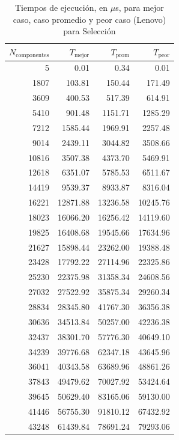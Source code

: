 \documentclass{homework}
\begin{document}
    \begin{table}[H] 
        \footnotesize
        \centering 
        \begin{tabular}{|r|r|r|r|} 
                \hline
                $N_{\text{componentes}}$ & $T_{\text{mejor}}$ & $T_{\text{prom}}$ & $T_{\text{peor}}$ \\
                \hline 
                5 & 0.01 & 0.34 & 0.01 \\ 
                1807 & 103.81 & 150.44 & 171.49 \\ 
                3609 & 400.53 & 517.39 & 614.91 \\ 
                5410 & 901.48 & 1151.71 & 1285.29 \\ 
                7212 & 1585.44 & 1969.91 & 2257.48 \\ 
                9014 & 2439.11 & 3044.82 & 3508.66 \\ 
                10816 & 3507.38 & 4373.70 & 5469.91 \\ 
                12618 & 6351.07 & 5785.53 & 6511.67 \\ 
                14419 & 9539.37 & 8933.87 & 8316.04 \\ 
                16221 & 12871.88 & 13236.58 & 10245.76 \\ 
                18023 & 16066.20 & 16256.42 & 14119.60 \\ 
                19825 & 16408.68 & 19545.66 & 17634.96 \\ 
                21627 & 15898.44 & 23262.00 & 19388.48 \\ 
                23428 & 17792.22 & 27114.96 & 22325.86 \\ 
                25230 & 22375.98 & 31358.34 & 24608.56 \\ 
                27032 & 27522.92 & 35875.34 & 29260.34 \\ 
                28834 & 28345.80 & 41767.30 & 36356.38 \\ 
                30636 & 34513.84 & 50257.00 & 42236.38 \\ 
                32437 & 38301.70 & 57776.30 & 40649.10 \\ 
                34239 & 39776.68 & 62347.18 & 43645.96 \\ 
                36041 & 40343.58 & 63689.96 & 48861.26 \\ 
                37843 & 49479.62 & 70027.92 & 53424.64 \\ 
                39645 & 50629.40 & 83165.06 & 59130.00 \\ 
                41446 & 56755.30 & 91810.12 & 67432.92 \\ 
                43248 & 61439.84 & 78691.24 & 79293.06 \\ 
                \hline
        \end{tabular}
        \caption{Tiempos de ejecución, en $\mu$s, para mejor caso, caso promedio y peor caso (Lenovo) para Selección}
    \end{table}
\end{document}
